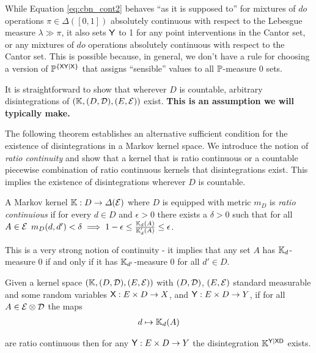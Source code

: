 While Equation \ref{eq:cbn_cont2} behaves ``as it is supposed to'' for mixtures of $do$ operations $\pi\in \Delta([0,1])$ absolutely continuous with respect to the Lebesgue measure $\lambda\gg \pi$, it also sets $\mathsf{Y}$ to 1 for any point interventions in the Cantor set, or any mixtures of $do$ operations absolutely continuous with respect to the Cantor set. This is possible because, in general, we don't have a rule for choosing a version of $\mathbb{P}^{\{\mathsf{XY}|\mathsf{X}\}}$ that assigns ``sensible'' values to all $\mathbb{P}$-measure 0 sets.

It is straightforward to show that wherever $D$ is countable, arbitrary disintegrations of $(\mathbb{K},(D,\mathcal{D}),(E,\mathcal{E}))$ exist. \textbf{This is an assumption we will typically make.}

The following theorem establishes an alternative sufficient condition for the existence of disintegrations in a Markov kernel space. We introduce the notion of \emph{ratio continuity} and show that a kernel that is ratio continuous or a countable piecewise combination of ratio continuous kernels that disintegrations exist. This implies the existence of disintegrations wherever $D$ is countable.

\begin{definition}
A Markov kernel $\mathbb{K}:D\to \Delta(\mathcal{E})$ where $D$ is equipped with metric $m_D$ is \emph{ratio continuious} if for every $d\in D$ and $\epsilon>0$ there exists a $\delta>0$ such that for all $A\in \mathcal{E}$ $m_D(d,d')<\delta\implies 1-\epsilon \leq \frac{\mathbb{K}_d(A)}{\mathbb{K}_d'(A)} \leq \epsilon$.
\end{definition}

This is a very strong notion of continuity - it implies that any set $A$ has $\mathbb{K}_d$-measure 0 if and only if it has $\mathbb{K}_{d'}$-measure 0 for all $d'\in D$.

\begin{theorem}\label{th:existence_continous}
Given a kernel space $(\mathbb{K},(D,\mathcal{D}),(E,\mathcal{E}))$ with $(D,\mathcal{D})$, $(E,\mathcal{E})$ standard measurable and some random variables $\mathsf{X}:E\times D\to X$, and $\mathsf{Y}:E\times D\to Y$, if for all $A\in \mathcal{E}\otimes\mathcal{D}$ the maps
\begin{align}
	d\mapsto \mathbb{K}_d(A)
\end{align}

are ratio continuous then for any $\mathsf{Y}:E\times D\to Y$ the disintegration $\mathbb{K}^{\mathsf{Y}|\mathsf{X}\mathsf{D}}$ exists.
\end{theorem}

